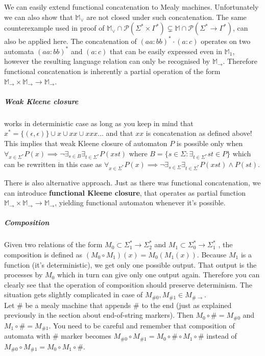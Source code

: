 \documentclass[12pt]{article}
\begin{document}
We can easily extend functional concatenation to Mealy machines. Unfortunately we can also show that $\mathbb{ M}_\vee$ are not closed under such concatenation. The same counterexample used in proof of $\mathbb{M}_\vee \cap \mathcal{P}(\Sigma^* \times \Gamma^*) \subsetneq  \mathbb{M} \cap \mathcal{P}(\Sigma^* \rightarrow \Gamma^*)$, can also be applied here. The concatenation of $(aa:bb)^* \cdot (a:c)$ operates on two automata $(aa:bb)^* $ and $(a:c)$ that can be easily expressed even in $\mathbb{ M}_1$, however the resulting language relation can only be recognised by $\mathbb{ M}_\rightarrow$.  Therefore functional concatenation is inherently a partial operation of the form $\mathbb{ M}_\rightarrow \times \mathbb{ M}_\rightarrow \rightarrow \mathbb{ M}_\rightarrow$.



\subparagraph{Weak Kleene closure}  works in deterministic case as long as you keep in mind that $x^* = \{(\epsilon,\epsilon) \} \cup x \cup xx \cup xxx ...$ and that $xx$ is concatenation as defined above! This implies that weak Kleene closure of automaton $P$ is possible only when $\forall_{x\in \Sigma^*} P(x) \implies \neg \exists_{s\in B} \exists_{t\in\Sigma^*} P(xst)$ where $B = \{s\in\Sigma : \exists_{t\in\Sigma^*}st\in P\}$ which can be rewritten in this case as  $\forall_{x\in \Sigma^*} P(x) \implies \neg \exists_{s\in \Sigma} \exists_{t\in\Sigma^*} P(xst) \wedge P(st)$. 

There is also alternative approach. Just as there was functional concatenation, we can introduce \textbf{ functional Kleene closure}, that operates as partial function $\mathbb{ M}_\rightarrow \times \mathbb{ M}_\rightarrow \rightarrow \mathbb{ M}_\rightarrow$, yielding functional automaton whenever it's possible.
 


\subparagraph{Composition} Given two relations of the form $M_0 \subset \Sigma_1^* \rightarrow \Sigma_2^*$ and $M_1 \subset \Sigma_0^* \rightarrow \Sigma_1^*$ , the composition is defined as $(M_0 \circ M_1)(x) = M_0(M_1(x))$. Because $M_1$ is a function (it's deterministic), we get only one possible output. That output is the processes by $M_0$ which in turn can give only one output again. Therefore you can clearly see that the operation of composition should preserve determinism. The situation gets slightly complicated in case of $M_{\#0},M_{\#1} \in M_{\#\rightarrow}$. \\
Let $\#$ be a mealy machine that appends $\#$ to the end (just as explained previously in the section about end-of-string markers). Then  $M_0 \circ \# = M_{\#0}$ and $M_1 \circ \# = M_{\#1}$. You need to be careful and remember that composition of automata with $\#$ marker becomes $M_{\#0} \circ M_{\#1} = M_0 \circ \# \circ M_1 \circ \#$ instead of  $M_{\#0} \circ M_{\#1} = M_0 \circ M_1 \circ \#$.
\end{document}
